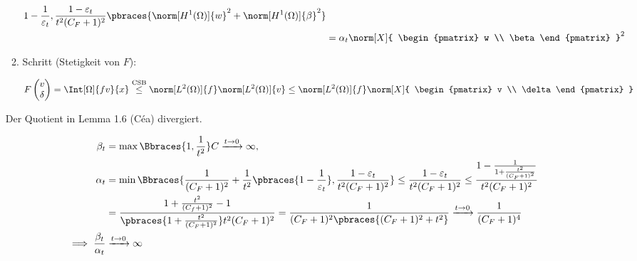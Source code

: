 \begin{solution}
\begin{enumerate}[label = \textbf{\alph*)}]
\begin{enumerate}[label = \arabic*.]
\begin{align*}
{{          1 - \frac{1}{\varepsilon_t}
        },
        \frac
        {
          1 - \varepsilon_t
        }{
          t^2 (C_F + 1)^2
        }
      }
      \pbraces
      {
        \norm[H^1(\Omega)]{w}^2
        +
        \norm[H^1(\Omega)]{\beta}^2
      } \\
      & =
      \alpha_t
      \norm[X]
      {
        \begin{pmatrix}
          w \\ \beta
        \end{pmatrix}
      }^2
    \end{align*}

    \item Schritt (Stetigkeit von $F$):

    \begin{align*}
      F
      \begin{pmatrix}
        v \\ \delta
      \end{pmatrix}
      =
      \Int[\Omega]{f v}{x}
      \stackrel
      {
        \mathrm{CSB}
      }{\leq}
      \norm[L^2(\Omega)]{f}
      \norm[L^2(\Omega)]{v}
      \leq
      \norm[L^2(\Omega)]{f}
      \norm[X]
      {
        \begin{pmatrix}
          v \\ \delta
        \end{pmatrix}
      }
    \end{align*}

  \end{enumerate}


  Der Quotient in Lemma 1.6 (Céa) divergiert.

  \begin{align*}
    \beta_t
    & =
    \max \Bbraces{1, \frac{1}{t^2}} C
    \xrightarrow{t \to 0}
    \infty, \\
    \alpha_t
    & =
    \min
    \Bbraces
    {
      \frac{1}{(C_F + 1)^2}
      +
      \frac{1}{t^2}
      \pbraces
      {
        1 - \frac{1}{\varepsilon_t}
      },
      \frac
      {
        1 - \varepsilon_t
      }{
        t^2 (C_F + 1)^2
      }
    }
    \leq
    \frac
    {
      1 - \varepsilon_t
    }{
      t^2 (C_F + 1)^2
    }
    \leq
    \frac
    {
      1
      -
      \frac{1}
      {
        1
        +
        \frac{t^2}{(C_F + 1)^2}
      }
    }{
      t^2 (C_F + 1)^2
    } \\
    & =
    \frac
    {
      1 + \frac{t^2}{(C_f + 1)^2} - 1
    }{
      \pbraces
      {
        1 + \frac{t^2}{(C_F + 1)^2}
      }
      t^2 (C_F + 1)^2
    }
    =
    \frac{1}
    {
      (C_F + 1)^2
      \pbraces
      {
        (C_F + 1)^2 + t^2
      }
    }
    \xrightarrow{t \to 0}
    \frac{1}{(C_F + 1)^4} \\
    \implies
    \frac{\beta_t}{\alpha_t}
    & \xrightarrow{t \to 0}
    \infty
  \end{align*}


\end{enumerate}
\end{solution}
